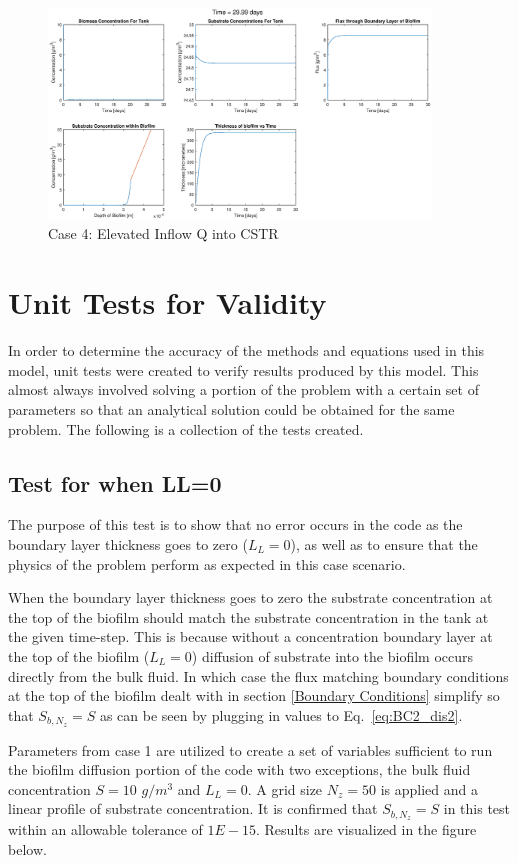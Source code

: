 \documentclass[letterpaper, twoside]{article}
\numberwithin{equation}{section}
\begin{document}
\begin{figure}[H]
  \centering
  \includegraphics[read=eps, width=4in]{Testcase4_figure.eps}
  \caption{Case 4: Elevated Inflow Q into CSTR}
\end{figure}

\section{Unit Tests for Validity}
In order to determine the accuracy of the methods and equations used in this model, unit tests were created to verify results produced by this model. This almost always involved solving a portion of the problem with a certain set of parameters so that an analytical solution could be obtained for the same problem. The following is a collection of the tests created.

\subsection{Test for when LL=0}
The purpose of this test is to show that no error occurs in the code as the boundary layer thickness goes to zero ($L_L=0$), as well as to ensure that the physics of the problem perform as expected in this case scenario.

When the boundary layer thickness goes to zero the substrate concentration at the top of the biofilm should match the substrate concentration in the tank at the given time-step. This is because without a concentration boundary layer at the top of the biofilm ($L_L=0$) diffusion of substrate into the biofilm occurs directly from the bulk fluid. In which case the flux matching boundary conditions at the top of the biofilm dealt with in section \ref{Boundary Conditions} simplify so that $S_{b,N_z}=S$ as can be seen by plugging in values to Eq.~\ref{eq:BC2_dis2}.

Parameters from case 1 are utilized to create a set of variables sufficient to run the biofilm diffusion portion of the code with two exceptions, the bulk fluid concentration $S=10$ $g/m^3$ and $L_L=0$. A grid size $N_z=50$ is applied and a linear profile of substrate concentration. It is confirmed that $S_{b,N_z}=S$ in this test within an allowable tolerance of $1E-15$. Results are visualized in the figure below.
\end{document}
